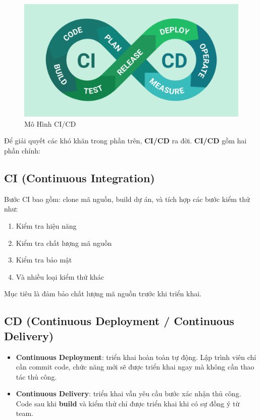\begin{figure}[htbp]
	\centering
	\includegraphics[width=1\linewidth]{Ảnh/defination-ci-cd.png}
	\caption{Mô Hình CI/CD}
	\label{fig:Mô Hình CI/CD}
\end{figure}


Để giải quyết các khó khăn trong phần trên, \textbf{CI/CD} ra đời.\textbf{ CI/CD} gồm hai phần chính:



\subsection*{CI (Continuous Integration)}

Bước CI bao gồm: clone mã nguồn, build dự án, và tích hợp các bước kiểm thử như:
\begin{enumerate}
	\item Kiểm tra hiệu năng 
	\item Kiểm tra chất lượng mã nguồn
	\item Kiểm tra bảo mật
	\item Và nhiều loại kiểm thử khác
\end{enumerate}
Mục tiêu là đảm bảo chất lượng mã nguồn trước khi triển khai.

\subsection*{CD (Continuous Deployment / Continuous Delivery)}
\begin{itemize}
	\item \textbf{Continuous Deployment}: triển khai hoàn toàn tự động. Lập trình viên chỉ cần commit code, chức năng mới sẽ được triển khai ngay mà không cần thao tác thủ công.
	\item \textbf{Continuous Delivery}: triển khai vẫn yêu cầu bước xác nhận thủ công. Code sau khi \textbf{build} và kiểm thử chỉ được triển khai khi có sự đồng ý từ team.
\end{itemize}



